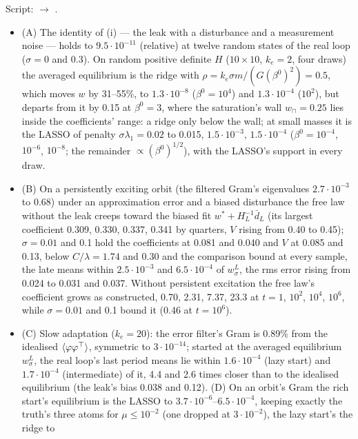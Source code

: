 Script:  $\to$ .
\begin{itemize}
  \item (A) The identity of (i) --- the leak with a disturbance and a measurement noise --- holds to $9.5\cdot10^{-11}$
    (relative) at twelve random states of the real loop ($\sigma = 0$ and 0.3). On random positive definite $H$
    ($10\times10$, $k_e = 2$, four draws) the averaged equilibrium is the ridge with
    $\rho = k_e\sigma m/(G(\beta^0)^2) = 0.5$, which moves $w$ by 31--55\%, to $1.3\cdot10^{-8}$ ($\beta^0 = 10^4$) and
    $1.3\cdot10^{-4}$ ($10^2$), but departs from it by 0.15 at $\beta^0 = 3$, where the saturation's wall
    $w_\sqcap = 0.25$ lies inside the coefficients' range: a ridge only below the wall; at small masses it is the LASSO of
    penalty $\sigma\lambda_1 = 0.02$ to 0.015, $1.5\cdot10^{-3}$, $1.5\cdot10^{-4}$ ($\beta^0 = 10^{-4}$, $10^{-6}$,
    $10^{-8}$; the remainder $\propto(\beta^0)^{1/2}$), with the LASSO's support in every draw.
  \item (B) On a persistently exciting orbit (the filtered Gram's eigenvalues $2.7\cdot10^{-3}$ to 0.68) under an
    approximation error and a biased disturbance the free law without the leak creeps toward the biased fit
    $w^* + H_L^{-1}\bar d_L$ (its largest coefficient 0.309, 0.330, 0.337, 0.341 by quarters, $V$ rising from 0.40 to
    0.45); $\sigma = 0.01$ and 0.1 hold the coefficients at 0.081 and 0.040 and $V$ at 0.085 and 0.13, below
    $C/\lambda = 1.74$ and 0.30 and the comparison bound at every sample, the late means within $2.5\cdot10^{-3}$ and
    $6.5\cdot10^{-4}$ of $w_\sigma^L$, the rms error rising from 0.024 to 0.031 and 0.037. Without persistent
    excitation the free law's coefficient grows as constructed, 0.70, 2.31, 7.37, 23.3 at $t = 1$, $10^2$, $10^4$,
    $10^6$, while $\sigma = 0.01$ and 0.1 bound it (0.46 at $t = 10^6$).
  \item (C) Slow adaptation ($k_e = 20$): the error filter's Gram is 0.89\% from the idealised
    $\langle\varphi\varphi^\top\rangle$, symmetric to $3\cdot10^{-14}$; started at the averaged equilibrium $w_\sigma^L$,
    the real loop's last period means lie within $1.6\cdot10^{-4}$ (lazy start) and $1.7\cdot10^{-4}$ (intermediate) of
    it, 4.4 and 2.6 times closer than to the idealised equilibrium (the leak's bias 0.038 and 0.12). (D) On an orbit's
    Gram the rich start's equilibrium is the LASSO to $3.7\cdot10^{-6}$--$6.5\cdot10^{-4}$, keeping exactly the truth's
    three atoms for $\mu\le10^{-2}$ (one dropped at $3\cdot10^{-2}$), the lazy start's the ridge to

\end{itemize}

